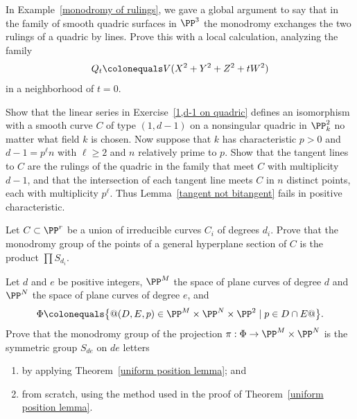 \begin{exercise}
In Example~\ref{monodromy of rulings}, we gave a global argument to say
that in the family of smooth quadric surfaces in $\PP^3$ the monodromy
exchanges the two rulings of a quadric by lines. Prove this with a local
calculation, analyzing the family
$$
Q_t \colonequals  V(X^2+Y^2+Z^2 + tW^2)
$$
in a neighborhood of $t=0$.
\end{exercise}

\begin{exercise}
\label{kaji}
Show that the linear series
in Exercise~\ref{1,d-1 on quadric}
%
defines an isomorphism with a smooth curve $C$ of type $(1, d-1)$ on a
nonsingular quadric in $\PP^2_k$ no matter what field $k$ is chosen. Now
suppose that  $k$ has characteristic $p>0$ and $d-1 = p^\ell n$ with
$\ell\ge 2$
and $n$ relatively prime to $p$.
Show that the tangent lines to $C$ are the rulings of the quadric in the
family that meet $C$ with multiplicity $d-1$, and that the intersection of
each tangent line meets $C$ in $n$ distinct points, each with multiplicity
$p^\ell$. Thus Lemma~\ref{tangent not bitangent}
fails in
positive characteristic.
%
\end{exercise}

\begin{exercise}
Let $C \subset \PP^r$ be a union of irreducible curves $C_i$ of degrees
$d_i$. Prove that the monodromy group of the points of a general
hyperplane section of $C$ is the product $\prod S_{d_i}$.
\end{exercise}

\begin{exercise}
Let $d$ and $e$ be positive integers, $\PP^M$ the space of plane curves
of degree $d$ and $\PP^N$ the space of plane curves of degree $e$, and
$$
\Phi \colonequals  \big\{@ (D, E, p) \in \PP^M \times \PP^N \times \PP^2 \mid
p \in D \cap E@\big \}.
$$
Prove that the monodromy group of the projection $\pi : \Phi \to \PP^M
\times \PP^N$ is the symmetric group $S_{de}$ on $de$ letters
\begin{enumerate}
\item by applying Theorem~\ref{uniform position lemma}; and
\item from scratch, using the method used in the proof of
Theorem~\ref{uniform position lemma}.
\end{enumerate}
\end{exercise}

